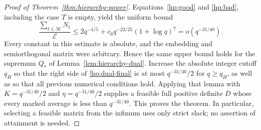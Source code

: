 \begin{proof}[Proof of Theorem~\ref{thm:hierarchy-power}]
Equations~\eqref{hp:good} and \eqref{hp:bad}, including the case $T$
is empty, yield the uniform bound
\begin{equation}\label{hp:dual-final}
 \frac{\sum_{t\in\mathcal M}N_t}{\mathcal E}
 \le2q^{-4/5}+c_6q^{-23/25}(1+\log q)^7
 =o(q^{-31/40}).
\end{equation}
Every constant in this estimate is absolute, and the embedding and
semiorthogonal matrix were arbitrary.  Hence the same upper bound holds
for the supremum $Q_*$ of Lemma~\ref{lem:hierarchy-dual}.  Increase
the absolute integer cutoff $q_H$ so that the right side of
\eqref{hp:dual-final} is at most $q^{-31/40}/2$ for $q\ge q_H$, as well
as so that all previous numerical conditions hold.
Applying that lemma with $K=q^{-31/40}/2$ and
$\eta=q^{-31/40}/2$ supplies a feasible full positive definite $D$
whose every marked average is less than $q^{-31/40}$.
This proves the theorem.  In particular, selecting a feasible matrix
from the infimum uses only strict slack; no assertion of attainment is
needed.
\end{proof}
